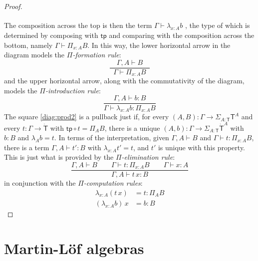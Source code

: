 \documentclass[12pt,reqno]{amsart}
\newcommand{\tp}{\ensuremath{\mathsf{tp}}}
\renewcommand{\to}{\ensuremath{\rightarrow}}
\newcommand{\G}{\ensuremath{\Gamma}}
\newcommand{\ext}[2]{{#1,#2}}
\newcommand{\T}{\ensuremath{\mathsf{T}}}
\newcommand{\TT}{\ensuremath{\dot{\mathsf{T}}}}
\theoremstyle{remark}
\theoremstyle{definition}
\begin{document}
\begin{proof}
\begin{equation*}
\begin{tikzcd}
\end{tikzcd}
\end{equation*}
The composition across the top is then the term $\G \vdash \lambda_{x:A} b$ , the type of which is determined by composing with $\tp$ and comparing with the composition across the bottom, namely $\G \vdash \Pi_{x:A} B$. In this way, the lower horizontal arrow in the diagram models the \emph{$\Pi$-formation rule}:
\[
\frac{\quad\ext{\G}{A}\vdash B\quad}{\G\vdash \Pi_{x:A} B}
\]
and the upper horizontal arrow, along with the commutativity of the diagram, models the \emph{$\Pi$-introduction rule}:
\[
\frac{\ext{\G}{A}\vdash b:B}{\G\vdash \lambda_{x:A} b : \Pi_{x:A} B}
\]
The square \eqref{diag:prod2} is a pullback just if, for every $(A,B) : \G \to \Sigma_{A:\T}\T^A$ and every $t: \G \to \TT$ with $\tp \circ t = \Pi_A B$, there is a unique $(A,b) : \G \to \Sigma_{A:\T}\TT^A$ with $b:B$ and $\lambda_A b = t$.  In terms of the interpretation, given $\ext{\G}{A} \vdash B$ and $\G\vdash t: \Pi_{x:A} B$, there is a term $\ext{\G}{A}\vdash t':B$ with $\lambda_{x:A}  t' = t$, and $t'$ is unique with this property.  This is just what is provided by the \emph{$\Pi$-elimination rule}:
\[
\frac{{\ext{\G}{A} \vdash B}\qquad {\G \vdash t : \Pi_{x:A}  B} \qquad {\G \vdash x:A}}{{\ext{\G}{A}\vdash t\, x :B}}
\]
in conjunction with the \emph{$\Pi$-computation rules}:
\begin{align*}
\lambda_{x:A} (t\,x) &= t : \Pi_A B\\
(\lambda_{x:A} b)\,x &= b : B
\end{align*}
\end{proof}


\section{Martin-L\"of algebras}\label{sec:MLalgebras}
\end{document}

